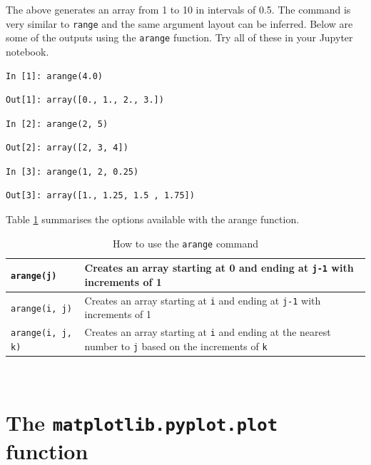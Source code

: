 \noindent The above generates an array from 1 to 10 in intervals of 0.5. The command is very similar to \texttt{range} and the same argument layout can be inferred. Below are some of the outputs using the \texttt{arange} function. Try all of these in your Jupyter notebook.
\begin{lstlisting}[style=PY]
In [1]: arange(4.0)
\end{lstlisting}
\begin{lstlisting}[style=PY_out]
Out[1]: array([0., 1., 2., 3.])
\end{lstlisting}
\begin{lstlisting}[style=PY]
In [2]: arange(2, 5)
\end{lstlisting}
\begin{lstlisting}[style=PY_out]
Out[2]: array([2, 3, 4])
\end{lstlisting}
\begin{lstlisting}[style=PY]
In [3]: arange(1, 2, 0.25)
\end{lstlisting}
\begin{lstlisting}[style=PY_out]
Out[3]: array([1., 1.25, 1.5 , 1.75])
\end{lstlisting}

\noindent Table \ref{tab:arc} summarises the options available with the arange function.
\begin{table}
\begin{center}
\begin{tabular}{|l | p{7cm}|}
\hline
\texttt{arange(j)} & Creates an array starting at 0 and ending at \texttt{j-1} with increments of 1\\\hline
\texttt{arange(i, j)} & Creates an array starting at \texttt{i} and ending at \texttt{j-1} with increments of 1\\\hline
\texttt{arange(i, j, k)} & Creates an array starting at \texttt{i} and ending at the nearest number to \texttt{j} based on the increments of \texttt{k}\\\hline
\end{tabular}
\end{center}
\caption {How to use the {\tt arange} command}
\label{tab:arc}
\end{table}\\

\newpage
\section{The \texttt{matplotlib.pyplot.plot} function}

